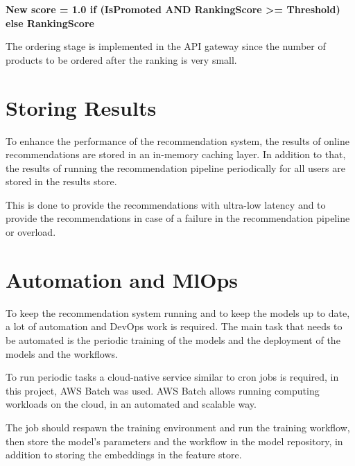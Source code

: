 \textbf{New score = { 1.0  if (IsPromoted AND RankingScore >= Threshold) else RankingScore }}

The ordering stage is implemented in the API gateway since the number of products to be ordered after the ranking is very small.


\section{Storing Results}

To enhance the performance of the recommendation system, the results of online recommendations are stored in an in-memory caching layer.
In addition to that, the results of running the recommendation pipeline periodically for all users are stored in the results store.

This is done to provide the recommendations with ultra-low latency and to provide the recommendations in case of a failure in the recommendation pipeline or overload.

\section{Automation and MlOps}

To keep the recommendation system running and to keep the models up to date, a lot of automation and DevOps work is required.
The main task that needs to be automated is the periodic training of the models and the deployment of the models and the workflows.

To run periodic tasks a cloud-native service similar to cron jobs is required, in this project, AWS Batch \cite{AwsBatch} was used.
AWS Batch allows running computing workloads on the cloud, in an automated and scalable way.

The job should respawn the training environment and run the training workflow, then store the model's parameters and the workflow in the model repository, in addition to storing the embeddings in the feature store.


